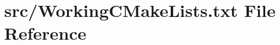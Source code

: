 \hypertarget{WorkingCMakeLists_8txt}{}\section{src/\+Working\+C\+Make\+Lists.txt File Reference}
\label{WorkingCMakeLists_8txt}
